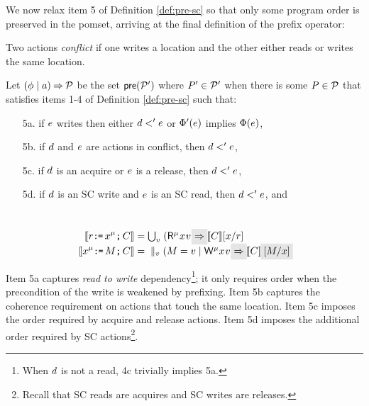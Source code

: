 We now relax item 5 of Definition \ref{def:pre-sc} so that only some program
order is {preserved} in the pomset, arriving at the final definition of
the prefix operator: %
\begin{definition}
  \label{def:prefix}
Two actions \emph{conflict} if one writes a location and the other
either reads or writes the same location.

Let $(\phi \mid a) \mathbin\Rightarrow \mathcal{P}$ be the set $\mathsf{pre}(\mathcal{P}')$ where
$P'\in\mathcal{P}'$ when
there is some $P\in\mathcal{P}$ that satisfies items 1-4 of
Definition \ref{def:pre-sc} such that:
\begin{enumerate}
\item[5a.] %
  if $e$ writes then either $d<'e$ or $\Phi'(e)$ implies $\Phi(e)$,
\item[5b.] if $d$ and $e$ are \external actions in conflict,
    then $d<'e$, %
\item[5c.] if $d$ is an acquire or $e$ is a release, then $d <' e$, 
\item[5d.] if $d$ is an SC write and $e$ is an SC read, then $d <' e$, and
\end{enumerate}
\end{definition}
\vspace{-2ex}
\begin{candidate}\ \vspace{-1ex}
  \label{cand:sc}
    \begin{align*}
    \sem{\aReg\GETS\aLoc^\amode\SEMI \aCmd} & =
    \textstyle\bigcup_\aVal\; (\DRmode\aLoc\aVal) \mathhl{\prefix}\; \sem{\aCmd} [\aLoc/\aReg] 
    \\
    \sem{\aLoc^\amode\GETS\aExp\SEMI \aCmd} & =
    \;\;\textstyle\parallel_\aVal (\aExp=\aVal \mid \DWmode\aLoc\aVal) \mathhl{\prefix}\; \sem{\aCmd}\mkern3.5mu\mathhl{[\aExp/\aLoc]}
  \end{align*}
\end{candidate}
Item 5a captures \emph{read to write} dependency\footnote{When $d$ is not a read,
  4c trivially implies 5a.}; it only requires order when the precondition of
the write is weakened by prefixing.  Item 5b captures the coherence
requirement on actions that touch the same location.  Item 5c imposes the
order required by acquire and release actions.  Item 5d imposes the
additional order required by SC actions\footnote{Recall that SC reads are
  acquires and SC writes are releases.}.  %

